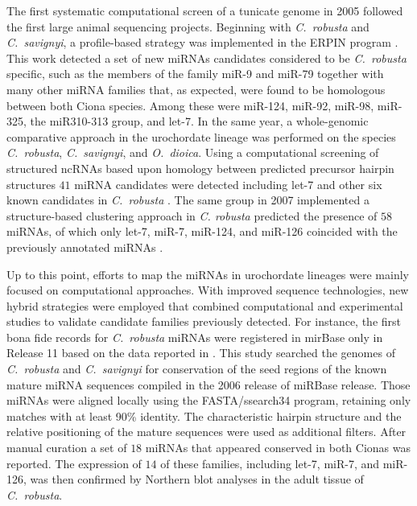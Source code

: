 \documentclass[graybox]{svmult}
\begin{document}
The first systematic computational screen of a tunicate genome in 2005
followed the first large animal sequencing projects. Beginning with
\textit{C.\ robusta} and \textit{C.\ savignyi}, a profile-based strategy
was implemented in the ERPIN program \cite{Legendre2005}. This work
detected a set of new miRNAs candidates considered to be \textit{C.\ robusta}
specific, such as the members of the family miR-9 and miR-79 together with
many other miRNA families that, as expected, were found to be homologous between
both Ciona species. Among these were miR-124, miR-92, miR-98, miR-325, 
the miR310-313 group, and let-7. In the same year, a whole-genomic comparative
approach in the urochordate lineage was performed on the species
\textit{C.\ robusta}, \textit{C.\ savignyi}, and \textit{O.\ dioica}. Using a
computational screening of structured ncRNAs based upon homology between
predicted precursor hairpin structures $41$ miRNA candidates were detected
including let-7 and other six known candidates in \textit{C.\ robusta}
\cite{Missal2005}. The same group in 2007 implemented a
structure-based clustering approach in \textit{C. robusta} predicted the 
presence of $58$ miRNAs, of which only let-7, miR-7, miR-124, and miR-126 
coincided with the previously annotated miRNAs \cite{Will2007}.

Up to this point, efforts to map the miRNAs in urochordate lineages
were mainly focused on computational approaches. With improved sequence
technologies, new hybrid strategies were employed that combined
computational and experimental studies to validate candidate families
previously detected. For instance, the first bona fide records for
\textit{C.\ robusta} miRNAs were registered in mirBase only in Release 11
based on the data reported in \cite{Norden-Krichmar2007}. This study
searched the genomes of \textit{C.\ robusta} and \textit{C.\ savignyi} for
conservation of the seed regions of the known mature miRNA sequences
compiled in the 2006 release of miRBase release. Those miRNAs were aligned
locally using the FASTA/ssearch34 program, retaining only matches with at
least 90\% identity. The characteristic hairpin structure and the relative
positioning of the mature sequences were used as additional filters. After
manual curation a set of $18$ miRNAs that appeared conserved in both Cionas
was reported. The expression of $14$ of these families, including let-7,
miR-7, and miR-126, was then confirmed by Northern blot analyses in the
adult tissue of \textit{C.\ robusta}.
\end{document}
